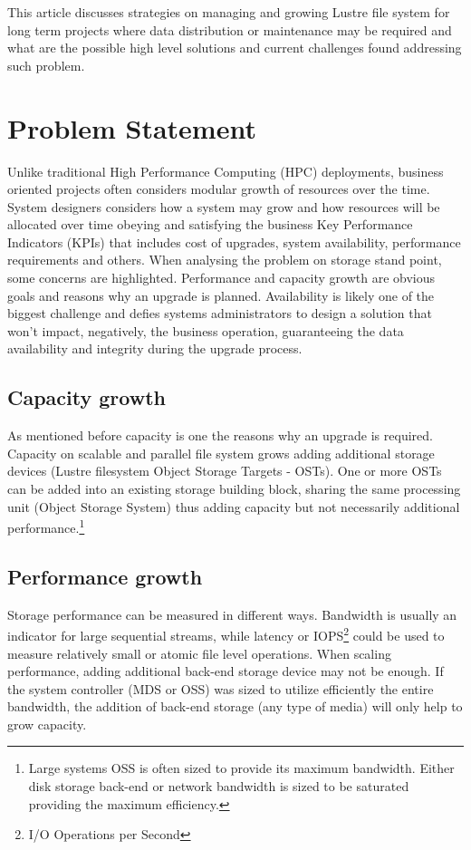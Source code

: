 \documentclass{article}
\begin{document}
This article discusses strategies on managing and growing Lustre file system for long term projects where data distribution or maintenance may be required and what are the possible high level solutions and current challenges found addressing such problem.

\section{Problem Statement}
Unlike traditional High Performance Computing (HPC) deployments, business oriented projects often considers modular growth of resources over the time. System designers considers how a system may grow and how resources will be allocated over time obeying and satisfying the business Key Performance Indicators (KPIs) that includes cost of upgrades, system availability, performance requirements and others. 
When analysing the problem on storage stand point, some concerns are highlighted. Performance and capacity growth are obvious goals and reasons why an upgrade is planned. Availability is likely one of the biggest challenge and defies systems administrators to design a solution that won't impact, negatively, the business operation, guaranteeing the data availability and integrity during the upgrade process.

\subsection{Capacity growth}
As mentioned before capacity is one the reasons why an upgrade is required. Capacity on scalable and parallel file system grows adding additional storage devices (Lustre filesystem Object Storage Targets - OSTs). One or more OSTs can be added into an existing storage building block, sharing the same processing unit (Object Storage System) thus adding capacity but not necessarily additional performance.\footnote{Large systems OSS is often sized to provide its maximum bandwidth. Either disk storage back-end or network bandwidth is sized to be saturated providing the maximum efficiency.}
\subsection{Performance growth}
Storage performance can be measured in different ways. Bandwidth is usually an indicator for large sequential streams, while latency or IOPS\footnote{I/O Operations per Second} could be used to measure relatively small or atomic file level operations. When scaling performance, adding additional back-end storage device may not be enough. If the system controller (MDS or OSS) was sized to utilize efficiently the entire bandwidth, the addition of back-end storage (any type of media) will only help to grow capacity.
\end{document}
